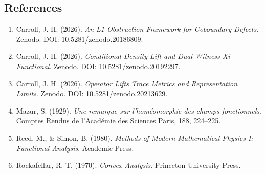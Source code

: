 \documentclass[
  10pt,
]{article}
\begin{document}
\subsection{References}\label{references}

\begin{enumerate}
\def\labelenumi{\arabic{enumi}.}
\item
  Carroll, J. H. (2026). \emph{An L1 Obstruction Framework for Coboundary Defects}. Zenodo. DOI: 10.5281/zenodo.20186809.
\item
  Carroll, J. H. (2026). \emph{Conditional Density Lift and Dual-Witness Xi Functional}. Zenodo. DOI: 10.5281/zenodo.20192297.
\item
  Carroll, J. H. (2026). \emph{Operator Lifts Trace Metrics and Representation Limits}. Zenodo. DOI: 10.5281/zenodo.20213629.
\item
  Mazur, S. (1929). \emph{Une remarque sur l'homéomorphie des champs fonctionnels}. Comptes Rendus de l'Académie des Sciences Paris, 188, 224--225.
\item
  Reed, M., \& Simon, B. (1980). \emph{Methods of Modern Mathematical Physics I: Functional Analysis}. Academic Press.
\item
  Rockafellar, R. T. (1970). \emph{Convex Analysis}. Princeton University Press.
\end{enumerate}
\end{document}
